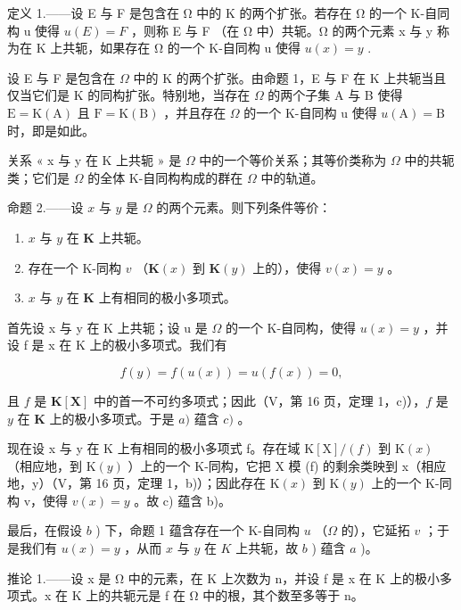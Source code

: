 定义 1.——设 E 与 F 是包含在 Ω 中的 K 的两个扩张。若存在 Ω 的一个 K-自同构 u 使得 \(u(E) = F\) ，则称 E 与 F （在 Ω 中）共轭。Ω 的两个元素 x 与 y 称为在 K 上共轭，如果存在 Ω 的一个 K-自同构 u 使得 \(u(x) = y\) .

设 E 与 F 是包含在 \(\Omega\) 中的 K 的两个扩张。由命题 1，E 与 F 在 K 上共轭当且仅当它们是 K 的同构扩张。特别地，当存在 \(\Omega\) 的两个子集 A 与 B 使得 \(\mathrm{E} = \mathrm{K}(\mathrm{A})\) 且 \(\mathrm{F} = \mathrm{K}(\mathrm{B})\) ，并且存在 \(\Omega\) 的一个 K-自同构 u 使得 \(u(\mathrm{A}) = \mathrm{B}\) 时，即是如此。

关系 « x 与 y 在 K 上共轭 » 是 \(\Omega\) 中的一个等价关系；其等价类称为 \(\Omega\) 中的共轭类；它们是 \(\Omega\) 的全体 K-自同构构成的群在 \(\Omega\) 中的轨道。

命题 2.——设 \(x\) 与 \(y\) 是 \(\Omega\) 的两个元素。则下列条件等价：

\begin{enumerate}
\def\labelenumi{\alph{enumi})}
\item
  \(x\) 与 \(y\) 在 \(\mathbf{K}\) 上共轭。
\item
  存在一个 K-同构 \(v\) （\(\mathbf{K}(x)\) 到 \(\mathbf{K}(y)\) 上的），使得 \(v(x) = y\) 。
\item
  \(x\) 与 \(y\) 在 \(\mathbf{K}\) 上有相同的极小多项式。
\end{enumerate}

首先设 x 与 y 在 K 上共轭；设 u 是 \(\Omega\) 的一个 K-自同构，使得 \(u(x) = y\) ，并设 f 是 x 在 K 上的极小多项式。我们有

\[
f (y) = f (u (x)) = u (f (x)) = 0,
\]

且 \(f\) 是 \(\mathbf{K}[\mathbf{X}]\) 中的首一不可约多项式；因此（V，第 16 页，定理 1，c)），\(f\) 是 \(y\) 在 \(\mathbf{K}\) 上的极小多项式。于是 \(a)\) 蕴含 \(c)\) 。

现在设 x 与 y 在 K 上有相同的极小多项式 f。存在域 \(\mathrm{K}[\mathrm{X}]/(f)\) 到 \(\mathrm{K}(x)\) （相应地，到 \(\mathrm{K}(y)\) ）上的一个 K-同构，它把 X 模 (f) 的剩余类映到 x（相应地，y）（V，第 16 页，定理 1，b)）；因此存在 \(\mathrm{K}(x)\) 到 \(\mathrm{K}(y)\) 上的一个 K-同构 v，使得 \(v(x)=y\) 。故 c) 蕴含 b)。

最后，在假设 \(b\) ) 下，命题 1 蕴含存在一个 K-自同构 \(u\) （\(\Omega\) 的），它延拓 \(v\) ；于是我们有 \(u(x) = y\) ，从而 \(x\) 与 \(y\) 在 \(K\) 上共轭，故 \(b\) ) 蕴含 \(a\) )。

推论 1.——设 x 是 Ω 中的元素，在 K 上次数为 n，并设 f 是 x 在 K 上的极小多项式。x 在 K 上的共轭元是 f 在 Ω 中的根，其个数至多等于 n。

